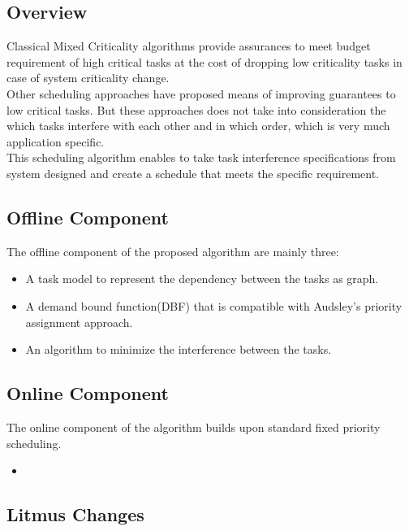 \subsection{Overview}
Classical Mixed Criticality algorithms provide assurances to meet budget requirement of high critical tasks at the cost of dropping low criticality tasks in case of system criticality change.\\
Other scheduling approaches have proposed means of improving guarantees to low critical tasks. But these approaches does not take into consideration the which tasks interfere with each other and in which order, which is very much application specific.\\
This scheduling algorithm enables to take task interference specifications from system designed and create a schedule that meets the specific requirement. 
\subsection{Offline Component}
The offline component of the proposed algorithm are mainly three:\\
\begin{itemize}
	\item A task model to represent the dependency between the tasks as graph.
	\item A demand bound function(DBF) that is compatible with Audsley's priority assignment approach.
	\item An algorithm to minimize the interference between the tasks.
\end{itemize}
\subsection{Online Component}
The online component of the algorithm builds upon standard fixed priority scheduling.
\begin{itemize}
	\item 
\end{itemize}
\subsection{Litmus Changes}